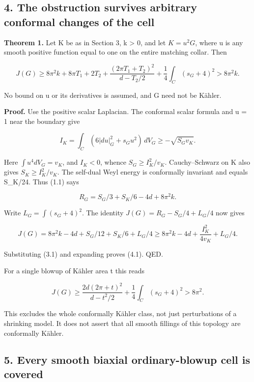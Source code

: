 \documentclass[
  10pt,
]{article}
\begin{document}
\hypertarget{the-obstruction-survives-arbitrary-conformal-changes-of-the-cell}{%
\subsection{4. The obstruction survives arbitrary conformal changes of
the
cell}\label{the-obstruction-survives-arbitrary-conformal-changes-of-the-cell}}

\textbf{Theorem 1.} Let K be as in Section 3, k \textgreater{} 0, and
let \(K=u^2G\), where u is any smooth positive function equal to one on
the entire matching collar. Then

\[
 \boxed{J(G)\ge 8\pi^2k+8\pi T_1+2T_2
       +\frac{(2\pi T_1+T_2)^2}{d-T_2/2}
       +\frac14\int_C(s_G+4)^2>8\pi^2k.}                 \tag{4.1}
\]

No bound on u or its derivatives is assumed, and G need not be Kähler.

\textbf{Proof.} Use the positive scalar Laplacian. The conformal scalar
formula and u = 1 near the boundary give

\[
 I_K=\int_C(6|du|_G^2+s_Gu^2)\,dV_G
       \ge-\sqrt{S_Gv_K}.
\]

Here \(\int u^4dV_G=v_K\), and \(I_K<0\), whence \(S_G\ge I_K^2/v_K\).
Cauchy--Schwarz on K also gives \(S_K\ge I_K^2/v_K\). The self-dual Weyl
energy is conformally invariant and equals S\_K/24. Thus (1.1) says

\[
 R_G=S_G/3+S_K/6-4d+8\pi^2k.
\]

Write \(L_G=\int(s_G+4)^2\). The identity \(J(G)=R_G-S_G/4+L_G/4\) now
gives

\[
 J(G)=8\pi^2k-4d+S_G/12+S_K/6+L_G/4
       \ge8\pi^2k-4d+\frac{I_K^2}{4v_K}+L_G/4.
\]

Substituting (3.1) and expanding proves (4.1). QED.

For a single blowup of Kähler area t this reads

\[
 J(G)\ge \frac{2d(2\pi+t)^2}{d-t^2/2}
                         +\frac14\int_C(s_G+4)^2>8\pi^2. \tag{4.2}
\]

This excludes the whole conformally Kähler class, not just perturbations
of a shrinking model. It does not assert that all smooth fillings of
this topology are conformally Kähler.

\hypertarget{every-smooth-biaxial-ordinary-blowup-cell-is-covered}{%
\subsection{5. Every smooth biaxial ordinary-blowup cell is
covered}\label{every-smooth-biaxial-ordinary-blowup-cell-is-covered}}
\end{document}
